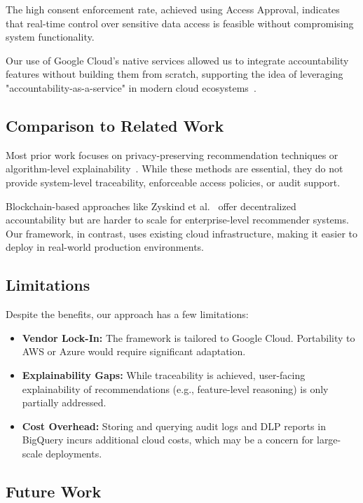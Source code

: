 \documentclass[acmsmall]{acmart}
\begin{document}
The high consent enforcement rate, achieved using Access Approval, indicates that real-time control over sensitive data access is feasible without compromising system functionality.

Our use of Google Cloud's native services allowed us to integrate accountability features without building them from scratch, supporting the idea of leveraging "accountability-as-a-service" in modern cloud ecosystems~\cite{weitzner2008information, anastasia2021accountability}.

\subsection{Comparison to Related Work}

Most prior work focuses on privacy-preserving recommendation techniques or algorithm-level explainability~\cite{zhang2020explainable, burkart2021survey}. While these methods are essential, they do not provide system-level traceability, enforceable access policies, or audit support.

Blockchain-based approaches like Zyskind et al.~\cite{zyskind2015decentralizing} offer decentralized accountability but are harder to scale for enterprise-level recommender systems. Our framework, in contrast, uses existing cloud infrastructure, making it easier to deploy in real-world production environments.

\subsection{Limitations}

Despite the benefits, our approach has a few limitations:

\begin{itemize}
    \item \textbf{Vendor Lock-In:} The framework is tailored to Google Cloud. Portability to AWS or Azure would require significant adaptation.
    \item \textbf{Explainability Gaps:} While traceability is achieved, user-facing explainability of recommendations (e.g., feature-level reasoning) is only partially addressed.
    \item \textbf{Cost Overhead:} Storing and querying audit logs and DLP reports in BigQuery incurs additional cloud costs, which may be a concern for large-scale deployments.
\end{itemize}

\subsection{Future Work}
\end{document}
